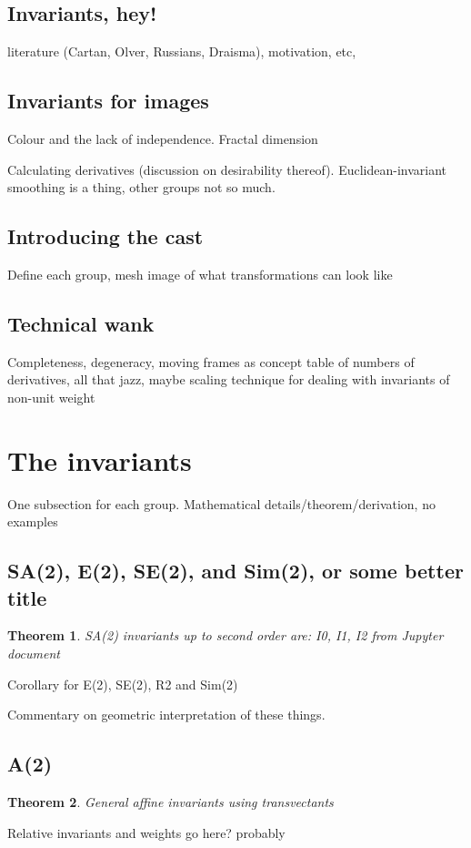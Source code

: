 \documentclass{article}
\newtheorem{theorem}{Theorem}
\begin{document}
\subsection{Invariants, hey!}
literature (Cartan, Olver, Russians, Draisma), motivation, etc,

\subsection{Invariants for images}
Colour and the lack of independence. Fractal dimension 

Calculating derivatives (discussion on desirability thereof).
Euclidean-invariant smoothing is a thing, other groups not so much.

\subsection{Introducing the cast}
Define each group, mesh image of what transformations can look like

\subsection{Technical wank}
Completeness, degeneracy, moving frames as concept table of numbers of
derivatives, all that jazz, maybe scaling technique
for dealing with invariants of non-unit weight


\section{The invariants}
One subsection for each group. Mathematical details/theorem/derivation, no
examples
\subsection{SA(2), E(2), SE(2), and Sim(2), or some better title}
\begin{theorem}
  SA(2) invariants up to second order are:
  I0, I1, I2 from Jupyter document
\end{theorem}

Corollary for E(2), SE(2), R2 and Sim(2)

Commentary on geometric interpretation of these things.
\subsection{A(2)}
\begin{theorem}
  General affine invariants using transvectants
\end{theorem}
Relative invariants and weights go here? probably
\end{document}
